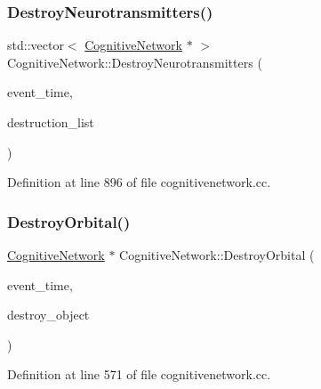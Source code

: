 \subsubsection{\texorpdfstring{Destroy\+Neurotransmitters()}{DestroyNeurotransmitters()}}
{\footnotesize\ttfamily std\+::vector$<$ \mbox{\hyperlink{class_cognitive_network}{Cognitive\+Network}} $\ast$ $>$ Cognitive\+Network\+::\+Destroy\+Neurotransmitters (\begin{DoxyParamCaption}\item[{std\+::chrono\+::time\+\_\+point$<$ \mbox{\hyperlink{universe_8h_a0ef8d951d1ca5ab3cfaf7ab4c7a6fd80}{Clock}} $>$}]{event\+\_\+time,  }\item[{std\+::vector$<$ \mbox{\hyperlink{class_cognitive_network}{Cognitive\+Network}} $\ast$$>$}]{destruction\+\_\+list }\end{DoxyParamCaption})}



Definition at line 896 of file cognitivenetwork.\+cc.

\mbox{\label{class_cognitive_network_aefecb3a2464f7f21449e522af5119c63}} 
\subsubsection{\texorpdfstring{Destroy\+Orbital()}{DestroyOrbital()}}
{\footnotesize\ttfamily \mbox{\hyperlink{class_cognitive_network}{Cognitive\+Network}} $\ast$ Cognitive\+Network\+::\+Destroy\+Orbital (\begin{DoxyParamCaption}\item[{std\+::chrono\+::time\+\_\+point$<$ \mbox{\hyperlink{universe_8h_a0ef8d951d1ca5ab3cfaf7ab4c7a6fd80}{Clock}} $>$}]{event\+\_\+time,  }\item[{\mbox{\hyperlink{class_cognitive_network}{Cognitive\+Network}} $\ast$}]{destroy\+\_\+object }\end{DoxyParamCaption})}



Definition at line 571 of file cognitivenetwork.\+cc.

\mbox{\label{class_cognitive_network_a0ee8259d26e30779bf06471fb8a10bb5}} 
